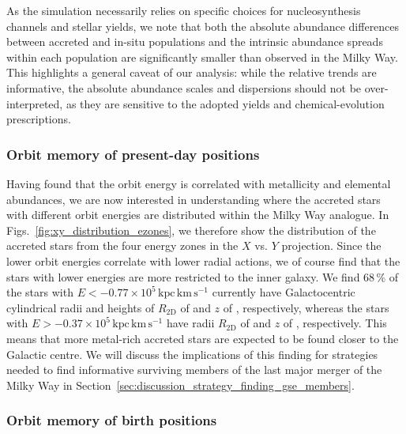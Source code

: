 \documentclass[fleqn,usenatbib]{mnras}
\begin{document}
As the simulation necessarily relies on specific choices for nucleosynthesis channels and stellar yields, we note that both the absolute abundance differences between accreted and in-situ populations and the intrinsic abundance spreads within each population are significantly smaller than observed in the Milky Way. This highlights a general caveat of our analysis: while the relative trends are informative, the absolute abundance scales and dispersions should not be over-interpreted, as they are sensitive to the adopted yields and chemical-evolution prescriptions.

\subsubsection{Orbit memory of present-day positions}

Having found that the orbit energy is correlated with metallicity and elemental abundances, we are now interested in understanding where the accreted stars with different orbit energies are distributed within the Milky Way analogue. In Figs.~\ref{fig:xy_distribution_ezones}, we therefore show the distribution of the accreted stars from the four energy zones in the $X$ vs. $Y$ projection. Since the lower orbit energies correlate with lower radial actions, we of course find that the stars with lower energies are more restricted to the inner galaxy. We find $68\,\mathrm{\%}$ of the stars with $E < -0.77\times10^5\,\mathrm{kpc\,km\,s^{-1}}$ currently have Galactocentric cylindrical radii and heights of $R_\mathrm{2D}$ of  and $z$ of , respectively, whereas the stars with $E > -0.37\times10^5\,\mathrm{kpc\,km\,s^{-1}}$ have radii $R_\mathrm{2D}$ of  and $z$ of , respectively. This means that more metal-rich accreted stars are expected to be found closer to the Galactic centre. We will discuss the implications of this finding for strategies needed to find informative surviving members of the last major merger of the Milky Way in Section~\ref{sec:discussion_strategy_finding_gse_members}.

\subsubsection{Orbit memory of birth positions}
\end{document}
